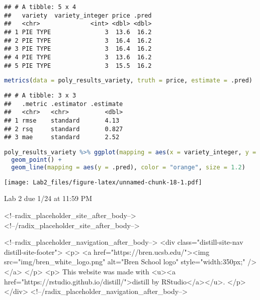 \documentclass[
]{article}
\begin{document}
\begin{lstlisting}
## # A tibble: 5 x 4
##   variety  variety_integer price .pred
##   <chr>              <int> <dbl> <dbl>
## 1 PIE TYPE               3  13.6  16.2
## 2 PIE TYPE               3  16.4  16.2
## 3 PIE TYPE               3  16.4  16.2
## 4 PIE TYPE               3  13.6  16.2
## 5 PIE TYPE               3  15.5  16.2
\end{lstlisting}

\begin{lstlisting}[language=R]
metrics(data = poly_results_variety, truth = price, estimate = .pred)
\end{lstlisting}

\begin{lstlisting}
## # A tibble: 3 x 3
##   .metric .estimator .estimate
##   <chr>   <chr>          <dbl>
## 1 rmse    standard       4.13 
## 2 rsq     standard       0.827
## 3 mae     standard       2.52
\end{lstlisting}

\begin{lstlisting}[language=R]
poly_results_variety %>% ggplot(mapping = aes(x = variety_integer, y = price)) +
  geom_point() +
  geom_line(mapping = aes(y = .pred), color = "orange", size = 1.2)
\end{lstlisting}

\texttt{[image: Lab2\_files/figure-latex/unnamed-chunk-18-1.pdf]}

Lab 2 due 1/24 at 11:59 PM

<!--radix_placeholder_site_after_body-->
<!--/radix_placeholder_site_after_body-->

<!--radix_placeholder_navigation_after_body-->
<div class="distill-site-nav distill-site-footer">
<p>
<a href="https://bren.ucsb.edu/"><img src="img/bren_white_logo.png" alt="Bren School logo" style="width:350px;" /></a>
</p>
<p>
  This website was made with <u><a href="https://rstudio.github.io/distill/">distill by RStudio</a></u>.
</p>
</div>
<!--/radix_placeholder_navigation_after_body-->
\end{document}
